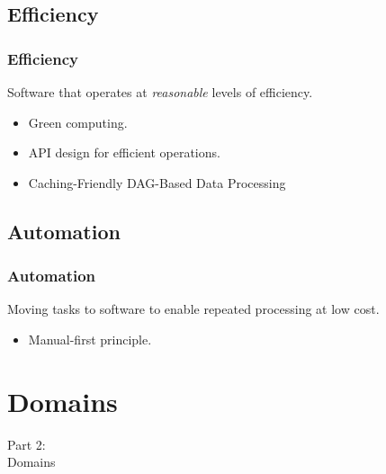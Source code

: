 \subsection{Efficiency}
\begin{frame}
    \frametitle{Efficiency}
    \vspace{0mm}
    Software that operates at \textsl{reasonable} levels of efficiency.
    \vspace{3mm}
    \begin{itemize}
        \item Green computing.
        \item API design for efficient operations.
        \item Caching-Friendly DAG-Based Data Processing
    \end{itemize}
\end{frame}

\subsection{Automation}
\begin{frame}
    \frametitle{Automation}
    \vspace{0mm}
    Moving tasks to software to enable repeated processing at low cost.
    \vspace{3mm}
    \begin{itemize}
        \item Manual-first principle.
    \end{itemize}
\end{frame}

\section{Domains}
\begin{frame}
    \vspace{25mm}
    \begin{center}
        \Huge{Part 2:\\Domains}
    \end{center}
\end{frame}

